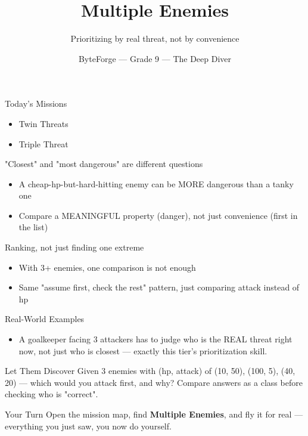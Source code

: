 \documentclass[aspectratio=169]{beamer}
\title{Multiple Enemies}
\subtitle{Prioritizing by real threat, not by convenience}
\author{ByteForge --- Grade 9 --- The Deep Diver}
\date{}
\begin{document}
\begin{frame}
    \titlepage
\end{frame}

\begin{frame}{Today's Missions}
    \Large
    \begin{itemize}
        \item Twin Threats
        \item Triple Threat
    \end{itemize}
\end{frame}

\begin{frame}{"Closest" and "most dangerous" are different questions}
    \large
    \begin{itemize}
        \item A cheap-hp-but-hard-hitting enemy can be MORE dangerous than a tanky one
        \item Compare a MEANINGFUL property (danger), not just convenience (first in the list)
    \end{itemize}
\end{frame}


\begin{frame}{Ranking, not just finding one extreme}
    \large
    \begin{itemize}
        \item With 3+ enemies, one comparison is not enough
        \item Same "assume first, check the rest" pattern, just comparing attack instead of hp
    \end{itemize}
\end{frame}

\begin{frame}{Real-World Examples}
    \large
    \begin{itemize}
        \item A goalkeeper facing 3 attackers has to judge who is the REAL threat right now, not just who is closest --- exactly this tier's prioritization skill.
    \end{itemize}
\end{frame}


\begin{frame}{Let Them Discover}
    \large
    Given 3 enemies with (hp, attack) of (10, 50), (100, 5), (40, 20) --- which would you attack first, and why? Compare answers as a class before checking who is "correct".
\end{frame}

\begin{frame}{Your Turn}
    \Large
    Open the mission map, find \textbf{Multiple Enemies}, and fly it for real ---
    everything you just saw, you now do yourself.
\end{frame}
\end{document}

